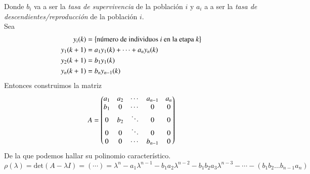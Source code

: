 Donde $b_i$ va a ser la \textit{tasa de supervivencia} de la población $i$ y $a_i$ a a ser la \textit{tasa de descendientes/reproducción} de la población $i$.\\
Sea
\begin{align*}
    y_i(k) &= \left\{\text{número de individuos $i$ en la etapa $k$}\right\}\\
    y_1(k+1) &= a_1y_1(k) + \cdots + a_ny_n(k)\\
    y_2(k+1) &= b_1y_1(k)\\
    y_n(k+1) &= b_ny_{n-1}(k)\\
\end{align*}
Entonces construimos la matriz
$$
    A = \px{
    a_1 & a_2 & \cdots & a_{n-1} & a_n\\
    b_1 & 0 & \cdots & 0 & 0\\
    0 & b_2 & \ddots & 0 & 0\\
    0 & 0 & \ddots & 0 & 0\\
    0 & 0 & \cdots & b_{n-1} & 0
    }
$$
De la que podemos hallar su polinomio característico.
$$
    \rho(\lambda) = \mathrm{det}(A - \lambda I) = (\cdots) = \lambda^n - a_1\lambda^{n-1} - b_1a_2\lambda^{n-2} - b_1b_2a_3\lambda^{n-3} - \cdots - (b_1b_2\ldots b_{n-1}a_n)
$$
